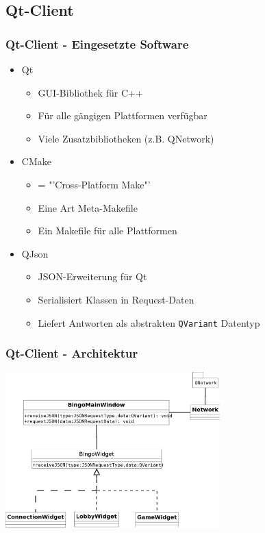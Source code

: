 \documentclass{beamer}
\begin{document}
\subsection{Qt-Client}
\begin{frame}[fragile]
\frametitle{Qt-Client - Eingesetzte Software}
\begin{itemize}
\item Qt
\begin{itemize}
\item GUI-Bibliothek für C++
\item Für alle gängigen Plattformen verfügbar
\item Viele Zusatzbibliotheken (z.B. QNetwork)
\end{itemize}
\item CMake
\begin{itemize}
\item = "'Cross-Platform Make"'
\item Eine Art Meta-Makefile
\item Ein Makefile für alle Plattformen
\end{itemize}
\item QJson
\begin{itemize}
\item JSON-Erweiterung für Qt
\item Serialisiert Klassen in Request-Daten
\item Liefert Antworten als abstrakten \texttt{QVariant} Datentyp
\end{itemize}
\end{itemize}
\end{frame}

\begin{frame}[fragile]
\frametitle{Qt-Client - Architektur}
\begin{center}
\includegraphics[height=6cm]{qt-klassendiagramm.png}
\end{center}
\end{frame}
\end{document}
